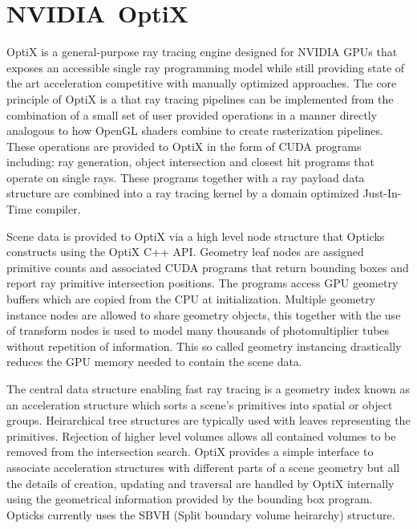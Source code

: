 \documentclass[a4paper]{jpconf}
\begin{document}
\section{NVIDIA\textregistered\ OptiX\texttrademark}

OptiX\cite{optixPaper} \cite{optixSite} is a general-purpose ray tracing engine 
designed for NVIDIA GPUs that exposes an accessible single ray programming model 
while still providing state of the art acceleration competitive with 
manually optimized approaches\cite{understanding}\cite{optixPaper}.  
%
The core principle of OptiX is a that ray tracing pipelines can be implemented 
from the combination of a small set of user provided operations
in a manner directly analogous to how OpenGL shaders combine to create rasterization pipelines.
These operations are provided to OptiX in the form of CUDA programs \cite{cudaPaper} \cite{cudaURL} 
including: ray generation, object intersection and closest hit programs that operate on 
single rays. These programs together with a ray payload data structure are combined 
into a ray tracing kernel by a domain optimized Just-In-Time compiler.

Scene data is provided to OptiX via a high level node structure that 
Opticks constructs using the OptiX C++ API. 
Geometry leaf nodes are assigned primitive counts 
and associated CUDA programs that return bounding boxes and 
report ray primitive intersection positions. 
The programs access GPU geometry buffers which are copied from the CPU at initialization.
Multiple geometry instance nodes are allowed to share geometry objects, this 
together with the use of transform nodes is used to model many thousands of  
photomultiplier tubes without repetition of information. This so called geometry 
instancing drastically reduces the GPU memory needed to contain the scene data.

The central data structure enabling fast ray tracing is a geometry index
known as an acceleration structure which sorts a scene’s primitives 
into spatial or object groups. 
Heirarchical tree structures are typically used
with leaves representing the primitives.  Rejection of higher level
volumes allows all contained volumes to be removed from the intersection
search. OptiX provides a simple interface to associate acceleration structures 
with different parts of a scene geometry but all the details of creation, updating 
and traversal are handled by OptiX internally using the geometrical information provided by the 
bounding box program. Opticks currently uses the SBVH (Split boundary volume heirarchy) structure\cite{sbvh}.
\end{document}
